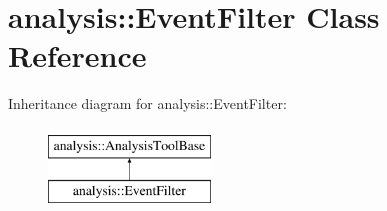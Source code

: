 \hypertarget{classanalysis_1_1EventFilter}{}\section{analysis\+:\+:Event\+Filter Class Reference}
\label{classanalysis_1_1EventFilter}
Inheritance diagram for analysis\+:\+:Event\+Filter\+:\begin{figure}[H]
\begin{center}
\leavevmode
\includegraphics[height=2.000000cm]{classanalysis_1_1EventFilter}
\end{center}
\end{figure}
